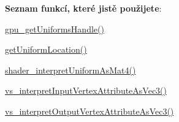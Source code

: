 \begin{DoxyRefList}
 {\bfseries Seznam funkcí, které jistě použijete}\-:
\begin{DoxyItemize}
\item \hyperlink{gpu_8h_a72dddc46dcba2d4e515fc23b61f0819a}{gpu\-\_\-get\-Uniforms\-Handle()}
\item \hyperlink{uniforms_8h_a6ea94982618b1c339a97a528b0670a53}{get\-Uniform\-Location()}
\item \hyperlink{uniforms_8h_a83cb2c94ffb0623e9bb8d9508885376a}{shader\-\_\-interpret\-Uniform\-As\-Mat4()}
\item \hyperlink{program_8h_a4bec56307c0d080bf314d20ff89773b2}{vs\-\_\-interpret\-Input\-Vertex\-Attribute\-As\-Vec3()}
\item \hyperlink{program_8h_a60d0546dc8c052ee90f699ddca3b540b}{vs\-\_\-interpret\-Output\-Vertex\-Attribute\-As\-Vec3()} 
\end{DoxyItemize}
\end{DoxyRefList}